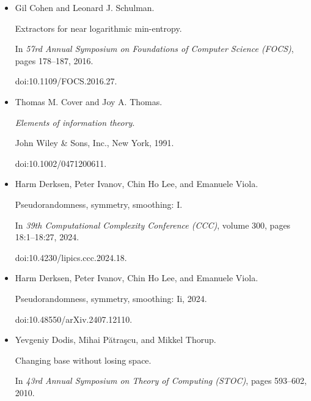 \documentclass[10pt,a4paper]{article}
\begin{document}
\begin{itemize}
doi:10.4007/annals.2019.189.3.1.





\item[] 
[11]

Gil Cohen and Leonard J. Schulman.


Extractors for near logarithmic min-entropy.


In \emph{57rd Annual Symposium on Foundations of Computer Science
(FOCS)}, pages 178–187, 2016.


doi:10.1109/FOCS.2016.27.





\item[] 
[12]

Thomas M. Cover and Joy A. Thomas.


\emph{Elements of information theory}.


John Wiley \& Sons, Inc., New York, 1991.


doi:10.1002/0471200611.





\item[] 
[13]

Harm Derksen, Peter Ivanov, Chin Ho Lee, and Emanuele Viola.


Pseudorandomness, symmetry, smoothing: I.


In \emph{39th Computational Complexity Conference (CCC)}, volume 300,
pages 18:1–18:27, 2024.


doi:10.4230/lipics.ccc.2024.18.





\item[] 
[14]

Harm Derksen, Peter Ivanov, Chin Ho Lee, and Emanuele Viola.


Pseudorandomness, symmetry, smoothing: Ii, 2024.


doi:10.48550/arXiv.2407.12110.





\item[] 
[15]

Yevgeniy Dodis, Mihai Pătraşcu, and Mikkel Thorup.


Changing base without losing space.


In \emph{43rd Annual Symposium on Theory of Computing (STOC)}, pages
593–602, 2010.



\end{itemize}
\end{document}
